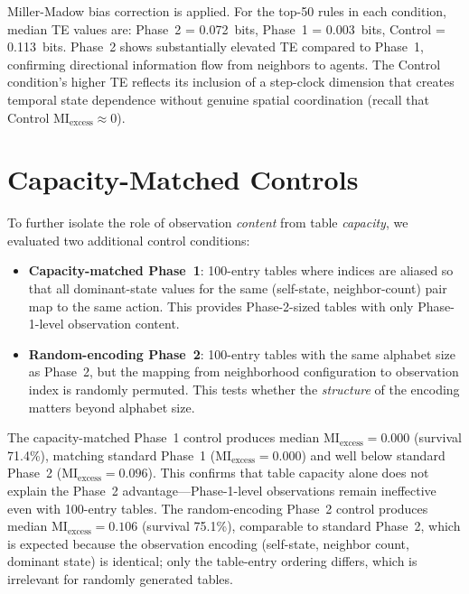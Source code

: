 \documentclass[letterpaper]{article}
\begin{document}
Miller-Madow bias correction is applied.  For the top-50 rules in each
condition, median TE values are: Phase~2 = 0.072~bits, Phase~1 =
0.003~bits, Control = 0.113~bits.  Phase~2 shows substantially elevated
TE compared to Phase~1, confirming directional information flow from
neighbors to agents.  The Control condition's higher TE reflects its
inclusion of a step-clock dimension that creates temporal state
dependence without genuine spatial coordination (recall that Control
$\mathrm{MI}_{\mathrm{excess}} \approx 0$).

\section{Capacity-Matched Controls}
\label{app:capacity_matched}

To further isolate the role of observation \emph{content} from table
\emph{capacity}, we evaluated two additional control conditions:

\begin{itemize}
  \item \textbf{Capacity-matched Phase~1}: 100-entry tables where
        indices are aliased so that all dominant-state values for the
        same (self-state, neighbor-count) pair map to the same action.
        This provides Phase-2-sized tables with only Phase-1-level
        observation content.
  \item \textbf{Random-encoding Phase~2}: 100-entry tables with the
        same alphabet size as Phase~2, but the mapping from neighborhood
        configuration to observation index is randomly permuted.  This
        tests whether the \emph{structure} of the encoding matters
        beyond alphabet size.
\end{itemize}

The capacity-matched Phase~1 control produces median
$\mathrm{MI}_{\mathrm{excess}} = 0.000$ (survival 71.4\%), matching
standard Phase~1 ($\mathrm{MI}_{\mathrm{excess}} = 0.000$) and well below
standard Phase~2 ($\mathrm{MI}_{\mathrm{excess}} = 0.096$).  This
confirms that table capacity alone does not explain the Phase~2
advantage---Phase-1-level observations remain ineffective even with
100-entry tables.  The random-encoding Phase~2 control produces median
$\mathrm{MI}_{\mathrm{excess}} = 0.106$ (survival 75.1\%), comparable to
standard Phase~2, which is expected because the observation encoding
(self-state, neighbor count, dominant state) is identical; only the
table-entry ordering differs, which is irrelevant for randomly generated
tables.
\end{document}
